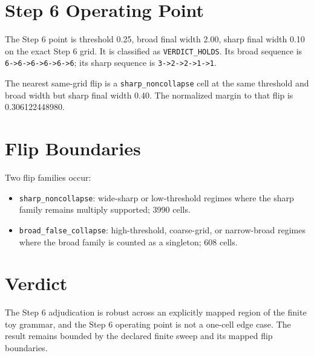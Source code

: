 \documentclass[11pt]{article}
\begin{document}
\section*{Step 6 Operating Point}

The Step 6 point is threshold 0.25, broad final width 2.00, sharp final width 0.10 on the exact Step 6 grid. It is classified as \texttt{VERDICT\_HOLDS}. Its broad sequence is \texttt{6->6->6->6->6->6}; its sharp sequence is \texttt{3->2->2->1->1}.

The nearest same-grid flip is a \texttt{sharp\_noncollapse} cell at the same threshold and broad width but sharp final width 0.40. The normalized margin to that flip is 0.306122448980.

\section*{Flip Boundaries}

Two flip families occur:

\begin{itemize}
\item \texttt{sharp\_noncollapse}: wide-sharp or low-threshold regimes where the sharp family remains multiply supported; 3990 cells.
\item \texttt{broad\_false\_collapse}: high-threshold, coarse-grid, or narrow-broad regimes where the broad family is counted as a singleton; 608 cells.
\end{itemize}

\section*{Verdict}

The Step 6 adjudication is robust across an explicitly mapped region of the finite toy grammar, and the Step 6 operating point is not a one-cell edge case. The result remains bounded by the declared finite sweep and its mapped flip boundaries.
\end{document}
